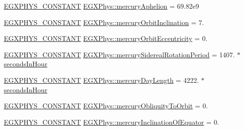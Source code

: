 \begin{DoxyCompactItemize}
\item 
\mbox{\hyperlink{group___e_g_x_phys-_constants-_macros_ga76980d288494ce1714c9ac68a95ba702}{E\+G\+X\+P\+H\+Y\+S\+\_\+\+C\+O\+N\+S\+T\+A\+NT}} \mbox{\hyperlink{group___e_g_x_phys-_constants-_astrophysics-_solar_system-_mercury-_orbit_gaffbe46a6fa3661973f7bb52ec3f55200}{E\+G\+X\+Phys\+::mercury\+Aphelion}} = 69.\+82e9
\item 
\mbox{\hyperlink{group___e_g_x_phys-_constants-_macros_ga76980d288494ce1714c9ac68a95ba702}{E\+G\+X\+P\+H\+Y\+S\+\_\+\+C\+O\+N\+S\+T\+A\+NT}} \mbox{\hyperlink{group___e_g_x_phys-_constants-_astrophysics-_solar_system-_mercury-_orbit_ga58319d10bf99a7f9e02d58440f1e5e91}{E\+G\+X\+Phys\+::mercury\+Orbit\+Inclination}} = 7.
\item 
\mbox{\hyperlink{group___e_g_x_phys-_constants-_macros_ga76980d288494ce1714c9ac68a95ba702}{E\+G\+X\+P\+H\+Y\+S\+\_\+\+C\+O\+N\+S\+T\+A\+NT}} \mbox{\hyperlink{group___e_g_x_phys-_constants-_astrophysics-_solar_system-_mercury-_orbit_gab6a88c67a02add73a0acd9c46b05d9bb}{E\+G\+X\+Phys\+::mercury\+Orbit\+Eccentricity}} = 0.
\item 
\mbox{\hyperlink{group___e_g_x_phys-_constants-_macros_ga76980d288494ce1714c9ac68a95ba702}{E\+G\+X\+P\+H\+Y\+S\+\_\+\+C\+O\+N\+S\+T\+A\+NT}} \mbox{\hyperlink{group___e_g_x_phys-_constants-_astrophysics-_solar_system-_mercury-_orbit_ga5908bc1ce452d68e135a79df00e7b242}{E\+G\+X\+Phys\+::mercury\+Sidereal\+Rotation\+Period}} = 1407. $\ast$ \mbox{\hyperlink{namespace_e_g_x_phys_a7c3165cd93e36f1fb8e9fef80f117bef}{seconds\+In\+Hour}}
\item 
\mbox{\hyperlink{group___e_g_x_phys-_constants-_macros_ga76980d288494ce1714c9ac68a95ba702}{E\+G\+X\+P\+H\+Y\+S\+\_\+\+C\+O\+N\+S\+T\+A\+NT}} \mbox{\hyperlink{group___e_g_x_phys-_constants-_astrophysics-_solar_system-_mercury-_orbit_ga76e5523953ddab271845bbaf597fc16c}{E\+G\+X\+Phys\+::mercury\+Day\+Length}} = 4222. $\ast$ \mbox{\hyperlink{namespace_e_g_x_phys_a7c3165cd93e36f1fb8e9fef80f117bef}{seconds\+In\+Hour}}
\item 
\mbox{\hyperlink{group___e_g_x_phys-_constants-_macros_ga76980d288494ce1714c9ac68a95ba702}{E\+G\+X\+P\+H\+Y\+S\+\_\+\+C\+O\+N\+S\+T\+A\+NT}} \mbox{\hyperlink{group___e_g_x_phys-_constants-_astrophysics-_solar_system-_mercury-_orbit_ga9eab31e7775425e9d213174b91d7cb7e}{E\+G\+X\+Phys\+::mercury\+Obliquity\+To\+Orbit}} = 0.
\item 
\mbox{\hyperlink{group___e_g_x_phys-_constants-_macros_ga76980d288494ce1714c9ac68a95ba702}{E\+G\+X\+P\+H\+Y\+S\+\_\+\+C\+O\+N\+S\+T\+A\+NT}} \mbox{\hyperlink{group___e_g_x_phys-_constants-_astrophysics-_solar_system-_mercury-_orbit_ga691d47f9e6155fde39610f722c2c81b3}{E\+G\+X\+Phys\+::mercury\+Inclination\+Of\+Equator}} = 0.

\end{DoxyCompactItemize}
